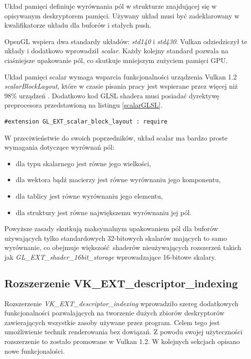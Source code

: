 Układ pamięci definiuje wyrównania pól w strukturze znajdującej się w opisywanym deskryptorem pamięci.
Używany układ musi być zadeklarowany w kwalifikatorze układu dla buforów i stałych push.

OpenGL wspiera dwa standardy układów: \textit{std140} i \textit{std430}.
Vulkan odziedziczył te układy i dodatkowo wprowadził \textit{scalar}.
Każdy kolejny standard pozwala na ciaśniejsze upakowanie pól, co skutkuje mniejszym zużyciem pamięci GPU.

Układ pamięci scalar wymaga wsparcia funkcjonalności urządzenia Vulkan 1.2 \textit{scalarBlockLayout}, które w czasie pisania pracy jest wspierane przez więcej niż $98\%$ urządzeń \cite{GPUINFO}.
Dodatkowo kod GLSL shadera musi posiadać dyrektywę preprocesora przedstawioną na listingu \ref{scalarGLSL}.
\lstset{language=GLSL}
\begin{lstlisting}[caption={Dyrektywa preprocesora dla układu pamięci skalar},captionpos=b, label={scalarGLSL}]
#extension GL_EXT_scalar_block_layout : require
\end{lstlisting}

W przeciwieństwie do swoich poprzedników, układ scalar ma bardzo proste wymagania dotyczące wyrównań pól:
\begin{itemize}
	\item dla typu skalarnego jest równe jego wielkości,
	\item dla wektora bądź macierzy jest równe wyrównaniu jego komponentu,
	\item dla tablicy jest równe wyrównaniu jego elementu,
	\item dla struktury jest równe największemu wyrównaniu jej pól.
\end{itemize}
Powyższe zasady skutkują maksymalnym upakowaniem pól dla buforów używających tylko standardowych 32-bitowych skalarów mających to samo wyrównanie, co obejmuje większość shaderów nieużywających rozszerzeń takich jak \textit{GL\_EXT\_shader\_16bit\_storage} wprowadzające 16-bitowe skalary.


\subsection{Rozszerzenie VK\_EXT\_descriptor\_indexing}

Rozszerzenie \textit{VK\_EXT\_descriptor\_indexing} wprowadziło szereg dodatkowych funkcjonalności pozwalających na tworzenie dużych zbiorów
deskryptorów zawierających wszystkie zasoby używane przez program.
Celem tego jest umożliwienie technik renderowania bez dowiązań. Z powodu swojej użyteczności rozszerzenie to zostało promowane w Vulkan 1.2.
W kolejnych sekcjach opisano nowe funkcjonalości.

